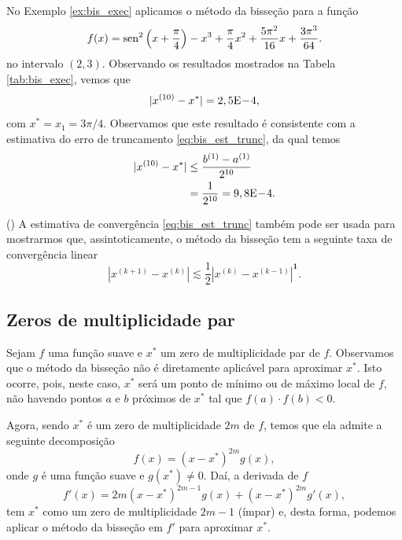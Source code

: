 \begin{ex}\label{ex:bis_conv}
  No Exemplo \ref{ex:bis_exec} aplicamos o método da bisseção para a função
\begin{equation}
  f(x) = \operatorname{sen}^2\left(x+\frac{\pi}{4}\right) - x^3 + \frac{\pi}{4}x^2 + \frac{5\pi^2}{16}x + \frac{3\pi^3}{64}.
\end{equation}
no intervalo $(2, 3)$. Observando os resultados mostrados na Tabela \ref{tab:bis_exec}, vemos que
\begin{equation}
  |x^{(10)}-x^*| = 2,5\mathrm{E}\!-\!4,
\end{equation}
com $x^* = x_1 = 3\pi/4$. Observamos que este resultado é consistente com a estimativa do erro de truncamento \eqref{eq:bis_est_trunc}, da qual temos
\begin{align}
  |x^{(10)} - x^*| &\leq \frac{b^{(1)}-a^{(1)}}{2^{10}}\\
  &= \frac{1}{2^{10}} = 9,8\mathrm{E}\!-\!4.
\end{align}
\end{ex}

\begin{obs}()
  A estimativa de convergência \eqref{eq:bis_est_trunc} também pode ser usada para mostrarmos que, assintoticamente, o método da bisseção tem a seguinte taxa de convergência linear
  \begin{equation}
    \left|x^{(k+1)} - x^{(k)}\right| \lesssim \frac{1}{2}\left|x^{(k)} - x^{(k-1)}\right|^{\pmb{1}}.
  \end{equation}
\end{obs}

\subsection{Zeros de multiplicidade par}

Sejam $f$ uma função suave e $x^*$ um zero de multiplicidade par de $f$. Observamos que o método da bisseção não é diretamente aplicável para aproximar $x^*$. Isto ocorre, pois, neste caso, $x^*$ será um ponto de mínimo ou de máximo local de $f$, não havendo pontos $a$ e $b$ próximos de $x^*$ tal que $f(a)\cdot f(b) < 0$.

Agora, sendo $x^*$ é um zero de multiplicidade $2m$ de $f$, temos que ela admite a seguinte decomposição
\begin{equation}
  f(x) = (x-x^*)^{2m}g(x),
\end{equation}
onde $g$ é uma função suave e $g(x^*)\neq 0$. Daí, a derivada de $f$
\begin{equation}
  f'(x) = 2m(x-x^*)^{2m-1}g(x) + (x-x^*)^{2m}g'(x),
\end{equation}
tem $x^*$ como um zero de multiplicidade $2m-1$ (ímpar) e, desta forma, podemos aplicar o método da bisseção em $f'$ para aproximar $x^*$.

